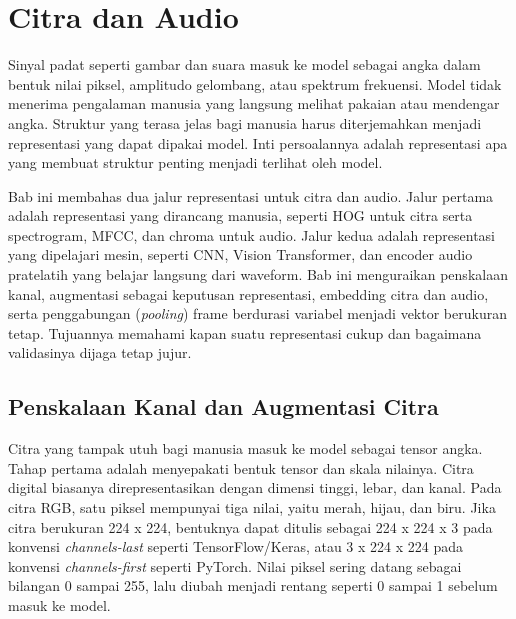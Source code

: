 \chapter{Citra dan Audio}\label{citra-dan-audio}

Sinyal padat seperti gambar dan suara masuk ke model sebagai angka dalam bentuk nilai piksel, amplitudo gelombang, atau spektrum frekuensi. Model tidak menerima pengalaman manusia yang langsung melihat pakaian atau mendengar angka. Struktur yang terasa jelas bagi manusia harus diterjemahkan menjadi representasi yang dapat dipakai model. Inti persoalannya adalah representasi apa yang membuat struktur penting menjadi terlihat oleh model.

Bab ini membahas dua jalur representasi untuk citra dan audio. Jalur pertama adalah representasi yang dirancang manusia, seperti HOG untuk citra serta spectrogram, MFCC, dan chroma untuk audio. Jalur kedua adalah representasi yang dipelajari mesin, seperti CNN, Vision Transformer, dan encoder audio pratelatih yang belajar langsung dari waveform. Bab ini menguraikan penskalaan kanal, augmentasi sebagai keputusan representasi, embedding citra dan audio, serta penggabungan (\emph{pooling}) frame berdurasi variabel menjadi vektor berukuran tetap. Tujuannya memahami kapan suatu representasi cukup dan bagaimana validasinya dijaga tetap jujur.

\section{Penskalaan Kanal dan Augmentasi Citra}\label{penskalaan-kanal-dan-augmentasi-citra}

Citra yang tampak utuh bagi manusia masuk ke model sebagai tensor angka. Tahap pertama adalah menyepakati bentuk tensor dan skala nilainya. Citra digital biasanya direpresentasikan dengan dimensi tinggi, lebar, dan kanal. Pada citra RGB, satu piksel mempunyai tiga nilai, yaitu merah, hijau, dan biru. Jika citra berukuran 224 x 224, bentuknya dapat ditulis sebagai 224 x 224 x 3 pada konvensi \emph{channels-last} seperti TensorFlow/Keras, atau 3 x 224 x 224 pada konvensi \emph{channels-first} seperti PyTorch. Nilai piksel sering datang sebagai bilangan 0 sampai 255, lalu diubah menjadi rentang seperti 0 sampai 1 sebelum masuk ke model.

